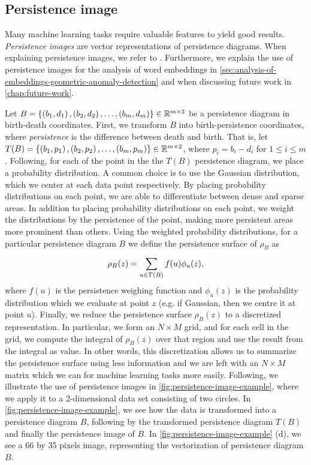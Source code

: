\subsection{Persistence image}
\label{sec:persistence-image}
Many machine learning tasks require valuable features to yield good results. \textit{Persistence images} \cite{adams2016persistence} are vector representations of persistence diagrams. When explaining persistence images, we refer to \cite{adams2016persistence}. Furthermore, we explain the use of persistence images for the analysis of word embeddings in \cref{sec:analysis-of-embeddings-geometric-anomaly-detection} and when discussing future work in \cref{chap:future-work}.

Let $B = \left\{\left(b_1, d_1\right), \left(b_2, d_2\right), \ldots, \left(b_m, d_m\right)\right\} \in \mathbb{R}^{m \times 2}$ be a persistence diagram in birth-death coordinates. First, we transform $B$ into birth-persistence coordinates, where \textit{persistence} is the difference between death and birth. That is, let $T(B) = \left\{\left(b_1, p_1\right), \left(b_2, p_2\right), \ldots, \left(b_m, p_m\right)\right\} \in \mathbb{R}^{m \times 2}$, where $p_i = b_i - d_i$ for $1 \leq i \leq m$. Following, for each of the point in the the $T(B)$ persistence diagram, we place a probability distribution. A common choice is to use the Gaussian distribution, which we center at each data point respectively. By placing probability distributions on each point, we are able to differentiate between dense and sparse areas. In addition to placing probability distributions on each point, we weight the distributions by the persistence of the point, making more persistent areas more prominent than others. Using the weighted probability distributions, for a particular persistence diagram $B$ we define the persistence surface of $\rho_B$ as
\begin{align}
    \rho_B(z) = \sum\limits_{u \in T(B)}^{} f(u) \phi_u(z),
\end{align}
where $f(u)$ is the persistence weighing function and $\phi_u(z)$ is the probability distribution which we evaluate at point $z$ (e.g. if Gaussian, then we centre it at point $u$). Finally, we reduce the persistence surface $\rho_B(z)$ to a discretized representation. In particular, we form an $N \times M$ grid, and for each cell in the grid, we compute the integral of $\rho_B(z)$ over that region and use the result from the integral as value. In other words, this discretization allows us to summarize the persistence surface using less information and we are left with an $N \times M$ matrix which we can for machine learning tasks more easily. Following, we illustrate the use of persistence images in \cref{fig:persistence-image-example}, where we apply it to a 2-dimensional data set consisting of two circles. In \cref{fig:persistence-image-example}, we see how the data is transformed into a persistence diagram $B$, following by the transformed persistence diagram $T(B)$ and finally the persistence image of $B$. In \cref{fig:persistence-image-example} (d), we see a 66 by 35 pixels image, representing the vectorization of persistence diagram $B$.
